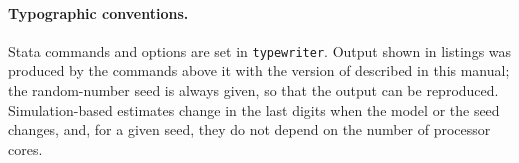 \paragraph{Typographic conventions.} Stata commands and options are set in \texttt{typewriter}. Output shown in listings was produced by the commands above it with the version of \nwsaom{} described in this manual; the random-number seed is always given, so that the output can be reproduced. Simulation-based estimates change in the last digits when the model or the seed changes, and, for a given seed, they do not depend on the number of processor cores.
